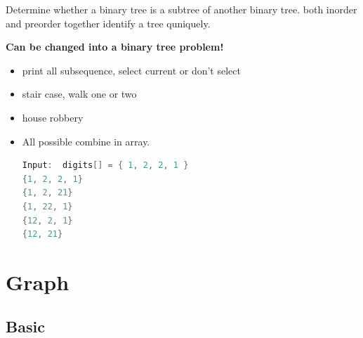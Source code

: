 \documentclass[a4paper,11pt,twoside]{book}
\begin{document}
%

	\par Determine whether a binary tree is a subtree of another binary tree. both inorder and preorder together identify a tree quniquely.

	\par \textbf{Can be changed into a binary tree problem!}
	
\begin{itemize}
	\item print all subsequence, select current or don't select
	\item stair case, walk one or two
	\item house robbery
	\item All possible combine in array. 
	
\begin{lstlisting}[frame=single, language=c++]	
Input:  digits[] = { 1, 2, 2, 1 }	
{1, 2, 2, 1} 
{1, 2, 21} 
{1, 22, 1} 
{12, 2, 1} 
{12, 21} 
\end{lstlisting}
\end{itemize}



\section{Graph}
\subsection{Basic}
\end{document}
